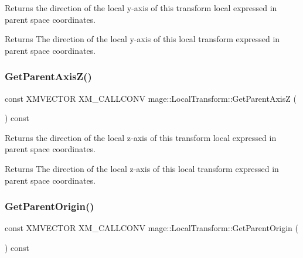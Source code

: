 Returns the direction of the local y-\/axis of this transform local expressed in parent space coordinates.

\begin{DoxyReturn}{Returns}
The direction of the local y-\/axis of this local transform expressed in parent space coordinates. 
\end{DoxyReturn}
\hypertarget{classmage_1_1_local_transform_acc8dd9207592af2db959b609bc14ae1f}{}\label{classmage_1_1_local_transform_acc8dd9207592af2db959b609bc14ae1f} 
\subsubsection{\texorpdfstring{Get\+Parent\+Axis\+Z()}{GetParentAxisZ()}}
{\footnotesize\ttfamily const X\+M\+V\+E\+C\+T\+OR X\+M\+\_\+\+C\+A\+L\+L\+C\+O\+NV mage\+::\+Local\+Transform\+::\+Get\+Parent\+AxisZ (\begin{DoxyParamCaption}{ }\end{DoxyParamCaption}) const\hspace{0.3cm}{\ttfamily [noexcept]}}

Returns the direction of the local z-\/axis of this transform local expressed in parent space coordinates.

\begin{DoxyReturn}{Returns}
The direction of the local z-\/axis of this local transform expressed in parent space coordinates. 
\end{DoxyReturn}
\hypertarget{classmage_1_1_local_transform_ad3577335f3be3237c89fe0b02b3cfd53}{}\label{classmage_1_1_local_transform_ad3577335f3be3237c89fe0b02b3cfd53} 
\subsubsection{\texorpdfstring{Get\+Parent\+Origin()}{GetParentOrigin()}}
{\footnotesize\ttfamily const X\+M\+V\+E\+C\+T\+OR X\+M\+\_\+\+C\+A\+L\+L\+C\+O\+NV mage\+::\+Local\+Transform\+::\+Get\+Parent\+Origin (\begin{DoxyParamCaption}{ }\end{DoxyParamCaption}) const\hspace{0.3cm}{\ttfamily [noexcept]}}

